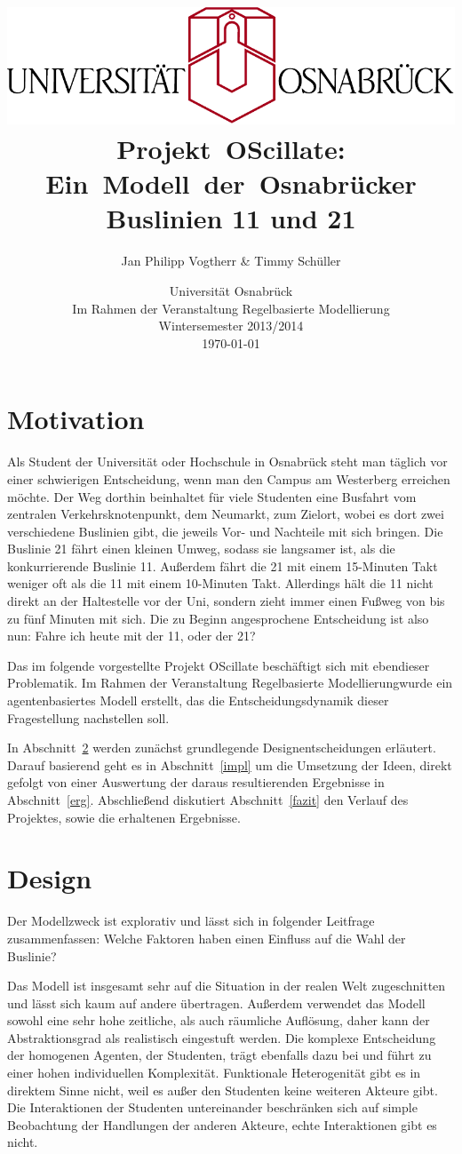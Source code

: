 \documentclass[12pt,a4paper]{scrartcl}
\author{Jan Philipp Vogtherr \& Timmy Schüller\vspace{0.5cm}}
\title{\includegraphics[scale=0.8]{unilogo.pdf}\vspace*{1cm}
\mbox{Projekt OScillate:} \mbox{Ein Modell der Osnabrücker} Buslinien 11 und 21\vspace{0.3cm}}
\date{Universität Osnabrück \\
Im Rahmen der Veranstaltung \glqq Regelbasierte Modellierung\grqq \\
\vspace*{0.4cm}
Wintersemester 2013/2014 \\
\today}
\begin{document}
\maketitle
\thispagestyle{empty}
\newpage
\tableofcontents
\newpage

\section{Motivation}
Als Student der Universität oder Hochschule in Osnabrück steht man täglich vor einer schwierigen Entscheidung, wenn man den Campus am Westerberg erreichen möchte. Der Weg dorthin beinhaltet für viele Studenten eine Busfahrt vom zentralen Verkehrsknotenpunkt, dem Neumarkt, zum Zielort, wobei es dort zwei verschiedene Buslinien gibt, die jeweils Vor- und Nachteile mit sich bringen. Die Buslinie 21 fährt einen kleinen Umweg, sodass sie langsamer ist, als die konkurrierende Buslinie 11. Außerdem fährt die 21 mit einem 15-Minuten Takt weniger oft als die 11 mit einem 10-Minuten Takt. Allerdings hält die 11 nicht direkt an der Haltestelle vor der Uni, sondern zieht immer einen Fußweg von bis zu fünf Minuten mit sich. Die zu Beginn angesprochene Entscheidung ist also nun: \glqq Fahre ich heute mit der 11, oder der 21?\grqq

Das im folgende vorgestellte Projekt OScillate beschäftigt sich mit ebendieser Problematik. Im Rahmen der Veranstaltung \glqq Regelbasierte Modellierung\grqq wurde ein agentenbasiertes Modell erstellt, das die Entscheidungsdynamik dieser Fragestellung nachstellen soll.

In Abschnitt~\ref{design} werden zunächst grundlegende Designentscheidungen erläutert. Darauf basierend geht es in Abschnitt~\ref{impl} um die Umsetzung der Ideen, direkt gefolgt von einer Auswertung der daraus resultierenden Ergebnisse in Abschnitt~\ref{erg}. Abschließend diskutiert Abschnitt~\ref{fazit} den Verlauf des Projektes, sowie die erhaltenen Ergebnisse.

\section{Design}\label{design}
Der Modellzweck ist explorativ und lässt sich in folgender Leitfrage zusammenfassen: \glqq Welche Faktoren haben einen Einfluss auf die Wahl der Buslinie?\grqq 

Das Modell ist insgesamt sehr auf die Situation in der realen Welt zugeschnitten und lässt sich kaum auf andere übertragen. Außerdem verwendet das Modell sowohl eine sehr hohe zeitliche, als auch räumliche Auflösung, daher kann der Abstraktionsgrad als realistisch eingestuft werden. Die komplexe Entscheidung der homogenen Agenten, der Studenten, trägt ebenfalls dazu bei und führt zu einer hohen individuellen Komplexität. Funktionale Heterogenität gibt es in direktem Sinne nicht, weil es außer den Studenten keine weiteren Akteure gibt. Die Interaktionen der Studenten untereinander beschränken sich auf simple Beobachtung der Handlungen der anderen Akteure, echte Interaktionen gibt es nicht.
\end{document}
